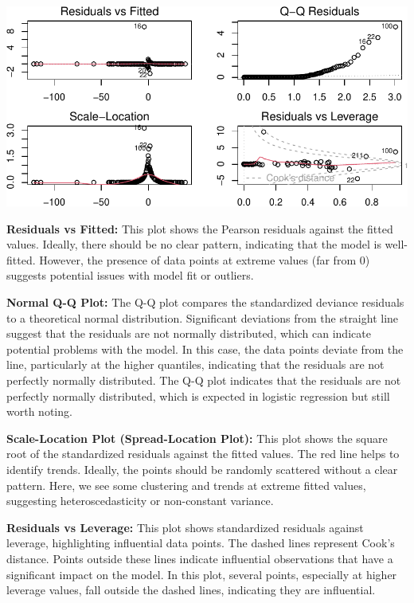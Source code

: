 \documentclass[
]{article}
\begin{document}
\begin{center}\includegraphics{Statistical_Learning_Final_Report_files/figure-latex/logistic_regression_evaluation_2-1} \end{center}

\textbf{Residuals vs Fitted:} This plot shows the Pearson residuals
against the fitted values. Ideally, there should be no clear pattern,
indicating that the model is well-fitted. However, the presence of data
points at extreme values (far from \(0\)) suggests potential issues with
model fit or outliers.

\textbf{Normal Q-Q Plot:} The Q-Q plot compares the standardized
deviance residuals to a theoretical normal distribution. Significant
deviations from the straight line suggest that the residuals are not
normally distributed, which can indicate potential problems with the
model. In this case, the data points deviate from the line, particularly
at the higher quantiles, indicating that the residuals are not perfectly
normally distributed. The Q-Q plot indicates that the residuals are not
perfectly normally distributed, which is expected in logistic regression
but still worth noting.

\textbf{Scale-Location Plot (Spread-Location Plot):} This plot shows the
square root of the standardized residuals against the fitted values. The
red line helps to identify trends. Ideally, the points should be
randomly scattered without a clear pattern. Here, we see some clustering
and trends at extreme fitted values, suggesting heteroscedasticity or
non-constant variance.

\textbf{Residuals vs Leverage:} This plot shows standardized residuals
against leverage, highlighting influential data points. The dashed lines
represent Cook's distance. Points outside these lines indicate
influential observations that have a significant impact on the model. In
this plot, several points, especially at higher leverage values, fall
outside the dashed lines, indicating they are influential.
\end{document}

